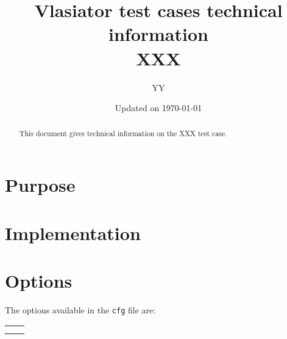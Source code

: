 \documentclass[a4paper,10pt]{scrartcl}
\title{
\Huge{Vlasiator test cases technical information} \\
\LARGE{XXX}
}
\author{YY}
\date{Updated on \today}
\begin{document}
\maketitle

\begin{abstract}
   This document gives technical information on the XXX test case.
\end{abstract}

\section{Purpose}



\section{Implementation}

\section{Options}
The options available in the \verb=cfg= file are:

\begin{tabularx}{\textwidth}{lX}
   \verb== &  \\
   \verb== &
\end{tabularx}
\end{document}
